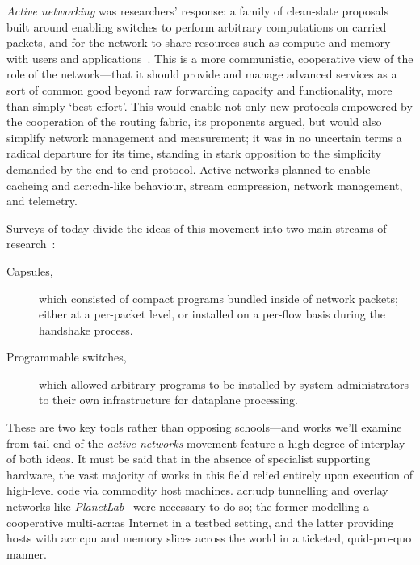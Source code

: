 \emph{Active networking} was researchers' response: a family of clean-slate proposals built around enabling switches to perform arbitrary computations on carried packets, and for the network to share resources such as compute and memory with users and applications~\parencite{DBLP:journals/ccr/TennenhouseW96,DBLP:journals/ccr/Calvert06}.
This is a more communistic, cooperative view of the role of the network---that it should provide and manage advanced services as a sort of common good beyond raw forwarding capacity and functionality, more than simply `best-effort'.
This would enable not only new protocols empowered by the cooperation of the routing fabric, its proponents argued, but would also simplify network management and measurement; it was in no uncertain terms a radical departure for its time, standing in stark opposition to the simplicity demanded by the end-to-end protocol.
Active networks planned to enable cacheing and \gls{acr:cdn}-like behaviour, stream compression, network management, and telemetry.

Surveys of today divide the ideas of this movement into two main streams of research~\parencite{DBLP:journals/ccr/FeamsterRZ14}:
\begin{description}
	\item[Capsules,] which consisted of compact programs bundled inside of network packets; either at a per-packet level, or installed on a per-flow basis during the handshake process.
	\item[Programmable switches,] which allowed arbitrary programs to be installed by system administrators to their own infrastructure for dataplane processing.
\end{description}
These are two key tools rather than opposing schools---and works we'll examine from tail end of the \emph{active networks} movement feature a high degree of interplay of both ideas.
It must be said that in the absence of specialist supporting hardware, the vast majority of works in this field relied entirely upon execution of high-level code via commodity host machines.
\gls{acr:udp} tunnelling and overlay networks like \emph{PlanetLab}~\parencite{DBLP:journals/ccr/ChunCRBPWB03} were necessary to do so; the former modelling a cooperative multi-\gls{acr:as} Internet in a testbed setting, and the latter providing hosts with \gls{acr:cpu} and memory slices across the world in a ticketed, quid-pro-quo manner.

